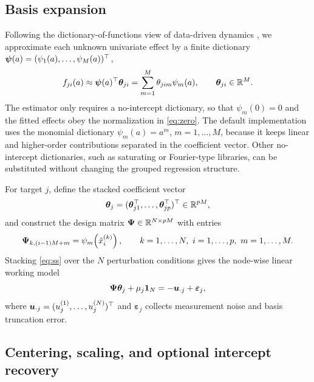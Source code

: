 \subsection{Basis expansion}
\label{sec:method:basis}

Following the dictionary-of-functions view of data-driven dynamics
\citep{brunton2016sindy,kaptanoglu2022pysindy}, we approximate each unknown
univariate effect by a finite dictionary
$\bm{\psi}(a)=(\psi_1(a),\ldots,\psi_M(a))^\top$,
\begin{equation}
  f_{ji}(a)
  \approx
  \bm{\psi}(a)^\top \bm{\theta}_{ji}
  =
  \sum_{m=1}^{M} \theta_{jim}\psi_m(a),
  \qquad
  \bm{\theta}_{ji}\in\mathbb{R}^M.
  \label{eq:basis}
\end{equation}
The estimator only requires a no-intercept dictionary, so that
$\psi_m(0)=0$ and the fitted effects obey the normalization in
\eqref{eq:zero}.  The default implementation uses the monomial dictionary
$\psi_m(a)=a^m$, $m=1,\ldots,M$, because it keeps linear and higher-order
contributions separated in the coefficient vector.  Other no-intercept
dictionaries, such as saturating or Fourier-type libraries, can be substituted
without changing the grouped regression structure.

For target $j$, define the stacked coefficient vector
\[
  \bm{\theta}_j
  =
  (\bm{\theta}_{j1}^\top,\ldots,\bm{\theta}_{jp}^\top)^\top
  \in \mathbb{R}^{pM},
\]
and construct the design matrix $\bm{\Psi}\in\mathbb{R}^{N\times pM}$ with entries
\begin{equation}
  \bm{\Psi}_{k,(i-1)M+m}
  =
  \psi_m\!\left(\tilde{x}_i^{(k)}\right),
  \qquad
  k=1,\ldots,N,\ i=1,\ldots,p,\ m=1,\ldots,M.
  \label{eq:design}
\end{equation}
Stacking \eqref{eq:ss} over the $N$ perturbation conditions gives the node-wise
linear working model
\begin{equation}
  \bm{\Psi}\bm{\theta}_j + \mu_j\mathbf{1}_N
  =
  -\bm{u}_{\cdot j} + \bm{\varepsilon}_j,
  \label{eq:linear}
\end{equation}
where $\bm{u}_{\cdot j}=(u_j^{(1)},\ldots,u_j^{(N)})^\top$ and
$\bm{\varepsilon}_j$ collects measurement noise and basis truncation error.

\subsection{Centering, scaling, and optional intercept recovery}
\label{sec:method:preprocess}


